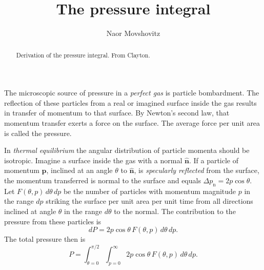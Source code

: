 \documentclass[10pt,amsmath,amssymb,aps,pra]{revtex4-2}
\newcommand{\V}[1]{\mathbf{#1}} %
\newcommand{\sub}[1]{_{\text{#1}}} %
\begin{document}
\title{The pressure integral}
\author{Naor Movshovitz}

\begin{abstract}
Derivation of the pressure integral. From Clayton.
\end{abstract}

\maketitle

The microscopic source of pressure in a \emph{perfect gas} is particle
bombardment. The reflection of these particles from a real or imagined surface
inside the gas results in transfer of momentum to that surface. By Newton's
second law, that momentum transfer exerts a force on the surface. The average
force per unit area is called the pressure.

In \emph{thermal equilibrium} the angular distribution of particle momenta
should be isotropic. Imagine a surface inside the gas with a normal
$\V{\hat{n}}$. If a particle of momentum $\V{p}$, inclined at an angle $\theta$
to $\V{\hat{n}}$, is \emph{specularly reflected}  from the surface, the momentum
transferred is normal to the surface and equals
$\Delta{p\sub{n}}=2p\cos{\theta}$. Let $F(\theta,p)\,d\theta\,d{p}$ be the
number of particles with momentum magnitude $p$ in the range $dp$ striking the
surface per unit area per unit time from all directions inclined at angle
$\theta$ in the range $d\theta$ to the normal. The contribution to the pressure
from these particles is
\begin{equation}
dP = 2p\cos{\theta}\,F(\theta,p)\,d\theta\,dp.
\end{equation}
The total pressure then is
\begin{equation}
P = \int_{\theta=0}^{\pi/2}\int_{p=0}^{\infty}
2p\cos{\theta}\,F(\theta,p)\,d\theta\,dp.
\end{equation}
\end{document}
